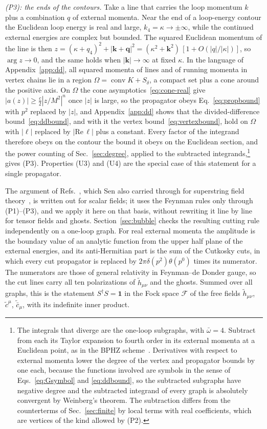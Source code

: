 \documentclass[aps,prd,10pt,twocolumn,superscriptaddress,nofootinbib,floatfix,longbibliography]{revtex4-2}
\begin{document}
\textit{(P3): the ends of the contours.} Take a line that carries the loop momentum $k$ plus a combination $q$ of external momenta. Near the end of a loop-energy contour the Euclidean loop energy is real and large, $k_4=\kappa\to\pm\infty$, while the continued external energies are complex but bounded. The squared Euclidean momentum of the line is then $z=(\kappa+q_4)^2+|\mathbf k+\mathbf q|^2=(\kappa^2+\mathbf k^2)\,[1+O(|q|/|\kappa|)]$, so $\arg z\to0$, and the same holds when $|\mathbf k|\to\infty$ at fixed $\kappa$. In the language of Appendix~\ref{app:dd}, all squared momenta of lines and of running momenta in vertex chains lie in a region $\Omega=\operatorname{conv}K+S_\delta$, a compact set plus a cone around the positive axis. On $\Omega$ the cone asymptotics~\eqref{eq:cone-real} give $|a(z)|\ge\frac c2|z/M^2|^n$ once $|z|$ is large, so the propagator obeys Eq.~\eqref{eq:propbound} with $p^2$ replaced by $|z|$, and Appendix~\ref{app:dd} shows that the divided-difference bound~\eqref{eq:ddbound}, and with it the vertex bound~\eqref{eq:vertexbound}, hold on $\Omega$ with $|\ell|$ replaced by $|\mathrm{Re}\,\ell|$ plus a constant. Every factor of the integrand therefore obeys on the contour the bound it obeys on the Euclidean section, and the power counting of Sec.~\ref{sec:degree}, applied to the subtracted integrands,\footnote{The integrals that diverge are the one-loop subgraphs, with $\bar\omega=4$. Subtract from each its Taylor expansion to fourth order in its external momenta at a Euclidean point, as in the BPHZ scheme~\cite{Collins1984}. Derivatives with respect to external momenta lower the degree of the vertex and propagator bounds by one each, because the functions involved are symbols in the sense of Eqs.~\eqref{eq:Gsymbol} and \eqref{eq:ddbound}, so the subtracted subgraphs have negative degree and the subtracted integrand of every graph is absolutely convergent by Weinberg's theorem. The subtraction differs from the counterterms of Sec.~\ref{sec:finite} by local terms with real coefficients, which are vertices of the kind allowed by (P2).} gives (P3). Properties (U3) and (U4) are the special case of this statement for a single propagator.

The argument of Refs.~\cite{PiusSen2016,BrisceseModesto2019}, which Sen also carried through for superstring field theory~\cite{Sen2016}, is written out for scalar fields; it uses the Feynman rules only through (P1)--(P3), and we apply it here on that basis, without rewriting it line by line for tensor fields and ghosts. Section~\ref{sec:bubble} checks the resulting cutting rule independently on a one-loop graph. For real external momenta the amplitude is the boundary value of an analytic function from the upper half plane of the external energies, and its anti-Hermitian part is the sum of the Cutkosky cuts, in which every cut propagator is replaced by $2\pi\delta(p^2)\theta(p^0)$ times its numerator. The numerators are those of general relativity in Feynman--de Donder gauge, so the cut lines carry all ten polarizations of $\tilde h_{\mu\nu}$ and the ghosts. Summed over all graphs, this is the statement $S^\dagger S=\mathbf 1$ in the Fock space $\mathcal F$ of the free fields $\tilde h_{\mu\nu}$, $\tilde c^\mu$, $\tilde{\bar c}_\mu$, with its indefinite inner product.
\end{document}
